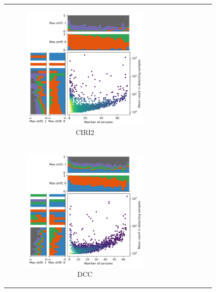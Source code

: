 \begin{figure}[H]
\begin{tabular}{cc}
\begin{subfigure}{.4\textwidth}
                       \includegraphics[width=\linewidth]{chapters/4_results_and_discussion/figures/detection/density/ciri2.png}
                       \caption{CIRI2} \label{fig:detection_density_ciri2}
                   \end{subfigure}
               \\ \begin{subfigure}{.4\textwidth}
            \centering

            \includegraphics[width=\linewidth]{chapters/4_results_and_discussion/figures/detection/density/dcc.png}
            \caption{DCC} \label{fig:detection_density_dcc} \end{subfigure} &
                  \begin{subfigure}{.4\textwidth} \centering


\end{subfigure}
\end{tabular}
\end{figure}
